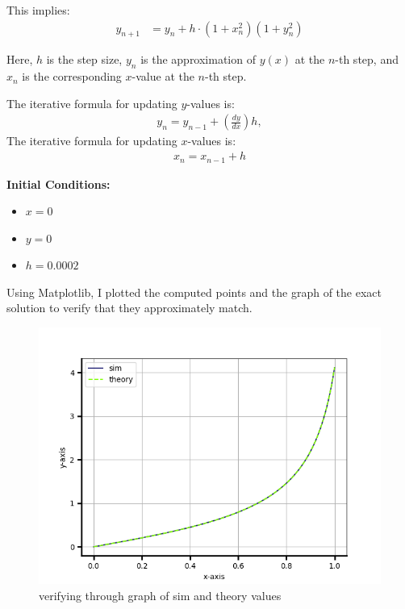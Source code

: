 \documentclass[article]{IEEEtran}
\numberwithin{figure}{enumi}
\begin{document}
This implies:
\begin{align}
y_{n+1} &= y_n + h \cdot (1 + x_n^2)(1 + y_n^2) 
\end{align}

Here, $h$ is the step size, $y_n$ is the approximation of $y(x)$ at the $n$-th step, and $x_n$ is the corresponding $x$-value at the $n$-th step.

\noindent The iterative formula for updating $y$-values is:  
\begin{align}
    y_n = y_{n-1} + \left(\frac{dy}{dx}\right) h,
\end{align}
The iterative formula for updating $x$-values is: 
\begin{align}
    x_n=x_{n-1}+h
\end{align} 

\noindent\textbf{Initial Conditions:}  
\begin{itemize}
    \item $x = 0$  
    \item $y = 0$  
    \item $h = 0.0002$  
\end{itemize}

Using Matplotlib, I plotted the computed points and the graph of the exact solution to verify that they approximately match.
\begin{figure}[h!]
	\centering
	\includegraphics[width=\columnwidth]{figures/Figure_1.png}
	\caption{verifying through graph of sim and theory values}
	\label{stemplot}
\end{figure}	
\end{document}
